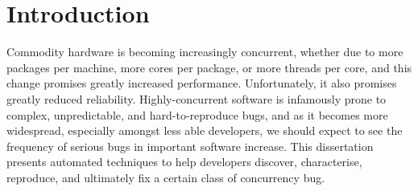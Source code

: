 \chapter{Introduction}

\label{sect:intro:overview}

Commodity hardware is becoming increasingly concurrent, whether due to
more packages per machine, more cores per package, or more threads per
core, and this change promises greatly increased performance.
Unfortunately, it also promises greatly reduced reliability.
Highly-concurrent software is infamously prone to complex,
unpredictable, and hard-to-reproduce bugs, and as it becomes more
widespread, especially amongst less able developers, we should expect
to see the frequency of serious bugs in important software increase.
This dissertation presents automated techniques to help developers
discover, characterise, reproduce, and ultimately fix a certain class
of concurrency bug.


